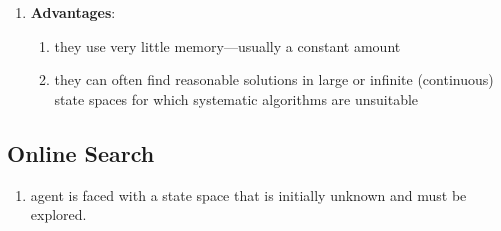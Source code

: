 \begin{enumerate}
    \item \textbf{Advantages}:
    \begin{enumerate}
        \item they use very little memory—usually a constant amount
        \hfill \cite{ai/book/Artificial-Intelligence-A-Modern-Approach/Russell-Norvig}

        \item they can often find reasonable solutions in large or infinite (continuous) state spaces for which systematic algorithms are unsuitable
        \hfill \cite{ai/book/Artificial-Intelligence-A-Modern-Approach/Russell-Norvig}
    \end{enumerate}
\end{enumerate}





\subsection{Online Search}

\begin{enumerate}
    \item agent is faced with a state space that is initially unknown and must be explored.
    \hfill \cite{ai/book/Artificial-Intelligence-A-Modern-Approach/Russell-Norvig}



\end{enumerate}















